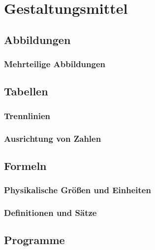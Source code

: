 \documentclass[twoside,a4paper,11pt,openright]{report}
\begin{document}
\appendix
\chapter{Gestaltungsmittel}
\label{app:latex}


\section{Abbildungen}


\subsection{Mehrteilige Abbildungen}



\section{Tabellen}



\subsection{Trennlinien}


\subsection{Ausrichtung von Zahlen}



\section{Formeln}

\subsection{Physikalische Größen und Einheiten}

\subsection{Definitionen und Sätze}


\section{Programme}
\end{document}
